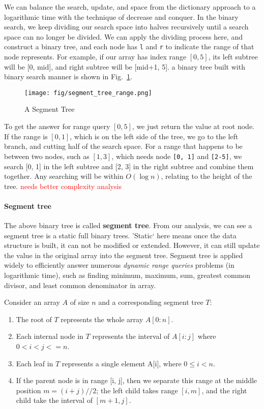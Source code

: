 \documentclass[main.tex]{subfiles}
\begin{document}
We can balance the search, update, and space from the dictionary approach to a logarithmic time with the technique of decrease and conquer. In the binary search, we keep dividing our search space into halves recursively until a search space can no longer be divided. We can apply the dividing process here, and construct a binary tree, and each node has \texttt{l} and \texttt{r} to indicate the range of that node represents. For example, if our array has index range $[0, 5]$,  its left subtree will be [0, mid], and right subtree will be [mid+1, 5]. a binary tree built with binary search manner is shown in Fig.~\ref{fig:segment_tree_range}.
\begin{figure}[H]
    \centering
    \texttt{[image: fig/segment\_tree\_range.png]}
    \caption{A Segment Tree }
    \label{fig:segment_tree_range}
\end{figure}
To get the answer for range query $[0, 5]$, we just return the value at root node. If the range is $[0, 1]$, which is on the left side of the tree, we go to the left branch, and cutting half of the search space. For a range that happens to be between two nodes, such as $[1, 3]$, which needs node \texttt{[0, 1]} and \texttt{[2-5]}, we search [0, 1] in the left subtree and [2, 3] in the right subtree and combine them together. Any searching will be within $O(\log n)$, relating to the height of the tree. \textcolor{red}{needs better complexity analysis} 

\paragraph{Segment tree} The above binary tree is called \textbf{segment tree}. From our analysis, we can see a segment tree is a static full binary trees. 'Static` here means once the data structure is built, it can not be modified or extended.  However, it can still update the value in the original array into the segment tree. Segment tree is applied widely to efficiently answer numerous \textit{dynamic range queries} problems 
(in logarithmic time), such as finding minimum, maximum, sum, greatest common divisor, and least common denominator in array.


Consider an array $A$ of size $n$ and a corresponding segment tree $T$:
\begin{enumerate}
    \item The root of $T$ represents the whole array $A[0:n]$. 
    \item Each internal node in $T$ represents the interval of $A[i:j]$ where $0 < i < j <= n$. 
    \item Each leaf in $T$ represents a single element A[i], where $0 \leq i<n$. 
    \item If the parent node is in range [i, j], then we separate this range at the middle position $m = (i+j)//2$; the left child takes range $[i, m]$, and the right child take the interval of $[m+1, j]$.
\end{enumerate}
\end{document}
